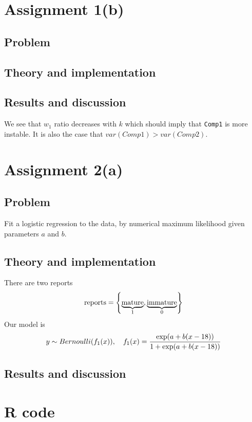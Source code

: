 \documentclass[11pt, a4paper]{article}
\let\originalleft\left
\let\originalright\right
\renewcommand{\left}{\mathopen{}\mathclose\bgroup\originalleft}
\renewcommand{\right}{\aftergroup\egroup\originalright}
\begin{document}
\section{Assignment 1(b)}
\subsection{Problem}
\subsection{Theory and implementation}
\subsection{Results and discussion}
We see that $w_1$ ratio decreases with $k$
which should imply that \texttt{Comp1} is more instable.
It is also the case that $var(Comp1) > var(Comp2)$.

\section{Assignment 2(a)}
\subsection{Problem}
Fit a logistic regression to the data, by numerical maximum likelihood
given parameters $a$ and $b$.
\subsection{Theory and implementation}
There are two reports
$$ \text{reports} = \left\{\underbrace{\text{mature}}_1, \underbrace{\text{immature}}_0\right\} $$
Our model is
$$ y \sim Bernoulli(f_1(x)), \quad f_1(x) = \frac{\exp\left(a + b (x - 18)\right)}{1 + \exp\left(a + b (x - 18)\right)} $$
\subsection{Results and discussion}

\clearpage
\appendix %

\section{R code}
% 
\end{document}
